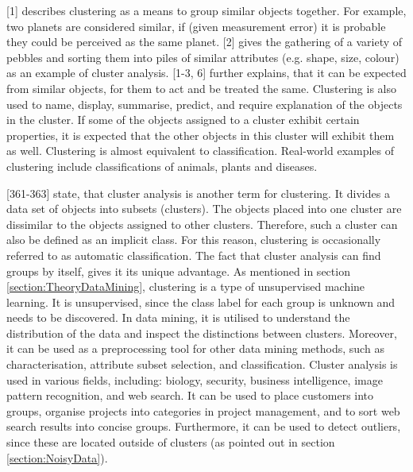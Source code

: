 


\textcite{hartigan1975clustering}[1] describes clustering as a means to group similar objects together. For example, two planets are considered similar, if (given measurement error) it is probable they could be perceived as the same planet. \textcite{romesburg2004cluster}[2] gives the gathering of a variety of pebbles and sorting them into piles of similar attributes (e.g. shape, size, colour) as an example of cluster analysis. \textcite{hartigan1975clustering}[1-3, 6] further explains, that it can be expected from similar objects, for them to act and be treated the same. Clustering is also used to name, display, summarise, predict, and require explanation of the objects in the cluster. If some of the objects assigned to a cluster exhibit certain properties, it is expected that the other objects in this cluster will exhibit them as well. Clustering is almost equivalent to classification. Real-world examples of clustering include classifications of animals, plants and diseases.

\textcite{han2011data}[361-363] state, that cluster analysis is another term for clustering. It divides a data set of objects into subsets (clusters). The objects placed into one cluster are dissimilar to the objects assigned to other clusters. Therefore, such a cluster can also be defined as an implicit class. For this reason, clustering is occasionally referred to as automatic classification. The fact that cluster analysis can find groups by itself, gives it its unique advantage. As mentioned in section \ref{section:TheoryDataMining}, clustering is a type of unsupervised machine learning. It is unsupervised, since the class label for each group is unknown and needs to be discovered. In data mining, it is utilised to understand the distribution of the data and inspect the distinctions between clusters. Moreover, it can be used as a preprocessing tool for other data mining methods, such as characterisation, attribute subset selection, and classification.
Cluster analysis is used in various fields, including: biology, security, business intelligence, image pattern recognition, and web search. It can be used to place customers into groups, organise projects into categories in project management, and to sort web search results into concise groups. Furthermore, it can be used to detect outliers, since these are located outside of clusters (as pointed out in section \ref{section:NoisyData}).


